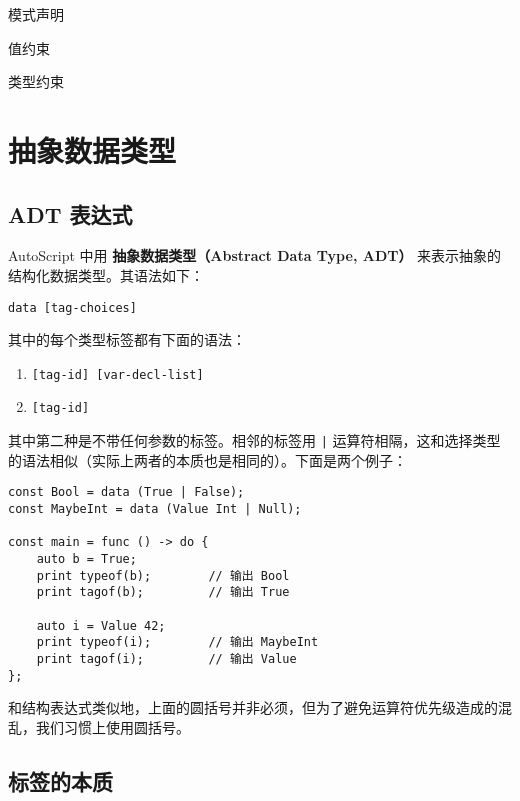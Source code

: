 \begin{introduction}
    \item 模式声明
    \item 值约束
    \item 类型约束
\end{introduction}

\section{抽象数据类型}

\subsection{ADT 表达式}

AutoScript 中用 \textbf{抽象数据类型（Abstract Data Type, ADT）} 来表示抽象的结构化数据类型。其语法如下：

\begin{grammar} \label{grm:adt-expression}
	\lstinline!data [tag-choices]!
\end{grammar}

其中的每个类型标签都有下面的语法：

\begin{grammar} \label{adt-tag-declaration}
\begin{enumerate}
	\item \lstinline![tag-id] [var-decl-list]!
	\item \lstinline![tag-id]!
\end{enumerate}
\end{grammar}

其中第二种是不带任何参数的标签。相邻的标签用 \lstinline!|! 运算符相隔，这和选择类型的语法相似（实际上两者的本质也是相同的）。下面是两个例子：

\begin{lstlisting}
const Bool = data (True | False);
const MaybeInt = data (Value Int | Null);

const main = func () -> do {
	auto b = True;
	print typeof(b);		// 输出 Bool
	print tagof(b);			// 输出 True
	
	auto i = Value 42;
	print typeof(i);		// 输出 MaybeInt
	print tagof(i);			// 输出 Value
};
\end{lstlisting}

和结构表达式类似地，上面的圆括号并非必须，但为了避免运算符优先级造成的混乱，我们习惯上使用圆括号。

\subsection{标签的本质}


